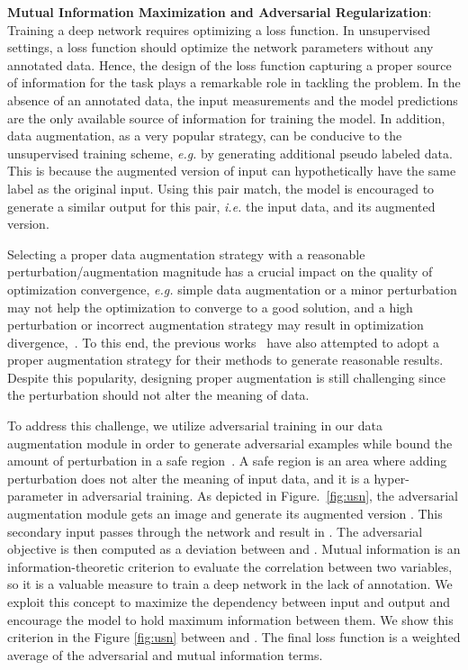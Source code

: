 \documentclass[letterpaper, 10 pt, journal, twoside]{IEEEtran}
\newcommand{\ie}{\emph{i.e.}\xspace}
\newcommand{\eg}{\emph{e.g.}\xspace}
\begin{document}
\textbf{Mutual Information Maximization and Adversarial Regularization}: Training a deep network requires optimizing a loss function. In unsupervised settings, a loss function should optimize the network parameters without any annotated data. Hence, the design of the loss function capturing a proper source of information for the task plays a remarkable role in tackling the problem. In the absence of an annotated data, the input measurements and the model predictions are the only available source of information for training the model. In addition, data augmentation, as a very popular strategy, can be conducive to the unsupervised training scheme, \eg by generating additional pseudo labeled data. This is because the augmented version of input can hypothetically have the same label as the original input. Using this pair match, the model is encouraged to generate a similar output for this pair, \ie the input data, and its augmented version.\par
Selecting a proper data augmentation strategy with a reasonable perturbation/augmentation magnitude has a crucial impact on the quality of optimization convergence, \eg simple data augmentation or a minor perturbation may not help the optimization to converge to a good solution, and a high perturbation or incorrect augmentation strategy may result in optimization divergence,~\cite{dataAug}. To this end, the previous works~\cite{IIC, UDA} have also attempted to adopt a proper augmentation strategy for their methods to generate reasonable results. Despite this popularity, designing proper augmentation is still challenging since the perturbation should not alter the meaning of data.\par
To address this challenge, we utilize adversarial training in our data augmentation module in order to generate adversarial examples while bound the amount of perturbation in a safe region~\cite{IMSAT}. A safe region is an area where adding perturbation does not alter the meaning of input data, and it is a hyper-parameter in adversarial training. As depicted in Figure.~\ref{fig:usn}, the adversarial augmentation module gets an image  and generate its augmented version . This secondary input passes through the network and result in . The adversarial objective is then computed as a deviation between  and . Mutual information is an information-theoretic criterion to evaluate the correlation between two variables, so it is a valuable measure to train a deep network in the lack of annotation. We exploit this concept to maximize the dependency between input and output and encourage the model to hold maximum information between them. We show this criterion in the Figure \ref{fig:usn} between  and .
The final loss function is a weighted average of the adversarial and mutual information terms.
\end{document}
